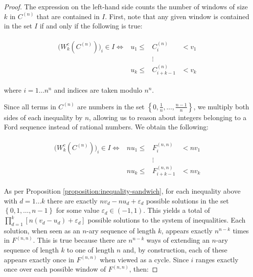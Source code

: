 \documentclass[11pt,a4paper]{tesis}
\theoremstyle{plain}
\theoremstyle{definition}
\begin{document}
\begin{proof}
  The expression on the left-hand side counts the number of windows of size $k$ in $C^{(n)}$ that are contained in $I$. First, note that any given window is contained in the set $I$ if and only if the following is true:
  
  \begin{equation*}
    \begin{aligned}
        \begin{array}{cccc}
          \big( W_k^{c}(C^{(n)}) \big)_i \in I \Longleftrightarrow & u_1 \le & C^{(n)}_{i}         & < v_1 \\
                              & & \vdots & \\
                              & u_k \le & C^{(n)}_{i + k - 1} & < v_k
        \end{array}
    \end{aligned}
  \end{equation*}
  
  where $i = 1 \dots n^n$ and indices are taken modulo $n^n$.

   Since all terms in $C^{(n)}$ are numbers in the set $ \left \{ 0, \frac{1}{n}, \dots, \frac{n - 1}{n} \right \}$, we multiply both sides of each inequality by $n$, allowing us to reason about integers belonging to a Ford sequence instead of rational numbers. We obtain the following:

  \begin{equation*}
    \begin{aligned}
        \begin{array}{cccc}
          \big( W_k^{c}(C^{(n)}) \big)_i \in I \Longleftrightarrow & n u_1 \le & F^{(n, n)}_{i}         & < n v_1 \\
                              & & \vdots & \\
                              & n u_k \le & F^{(n, n)}_{i + k - 1} & < n v_k
        \end{array}
    \end{aligned}
  \end{equation*}

  As per Proposition \ref{proposition:inequality-sandwich}, for each inequality above with $d = 1 \dots k$ there are exactly $n v_d - n u_d + \varepsilon_d$ possible solutions in the set $ \left \{ 0, 1, \dots, n - 1 \right \} $ for some value $\varepsilon_d \in (-1, 1)$. This yields a total of $\prod_{d = 1}^{k} [n (v_d - u_d) + \varepsilon_d]$ possible solutions to the system of inequalities. Each solution, when seen as an $n$-ary sequence of length $k$, appears exactly $n^{n - k}$ times in $F^{(n, n)}$. This is true because there are  $n^{n - k}$ ways of extending an $n$-ary sequence of length $k$ to one of length $n$ and, by construction, each of these appears exactly once in $F^{(n, n)}$ when viewed as a cycle. Since $i$ ranges exactly once over each possible window of $F^{(n, n)}$, then:


\end{proof}
\end{document}
